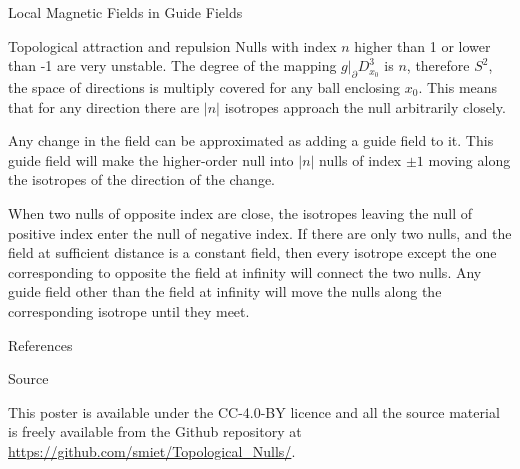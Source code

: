 \documentclass[final]{beamer}
\newlength{\onecolwid}
\begin{document}
\begin{frame}[t]
\begin{columns}[t]
\begin{column}{\onecolwid}
\begin{block}{\huge{Local Magnetic Fields in Guide Fields}}
\begin{block}{Topological attraction and repulsion}
    Nulls with index $n$ higher than 1 or lower than -1 are very unstable.  The degree of
    the mapping $g|_\partial D^3_{x_0}$ is $n$, therefore $S^2$, the space of
    directions is multiply covered for any ball enclosing $x_0$. 
    This means that for any direction there are $|n|$ isotropes approach the null arbitrarily
    closely. 

    Any change in the field can be approximated as 
    adding a guide field to it. 
    This guide field will make the higher-order null into $|n|$ nulls of index $\pm 1$ moving along the
    isotropes of the direction of the change. 

    When two nulls of opposite index are close, the isotropes leaving the null of positive
    index enter the null of negative index. 
    If there are only two nulls, and the field at sufficient distance is a constant field,
    then every isotrope except the one corresponding to opposite the field at infinity
    will connect the two nulls. 
    Any guide field other than the field at infinity will move the nulls along the
    corresponding isotrope until they meet. 
\end{block}


\end{block}




\begin{block}{References}

\nocite{*} %
\small{
\vspace{0.75in}}

\end{block}

\begin{block}{Source}
\begin{centering}
    \hfill
    \hfill
\end{centering}

	\vspace{1cm}
This poster is available under the  CC-4.0-BY  licence and all the source material is freely
available from the Github repository at \url{https://github.com/smiet/Topological_Nulls/}.


\end{block}
\end{column}
\end{columns}
\end{frame}
\end{document}
